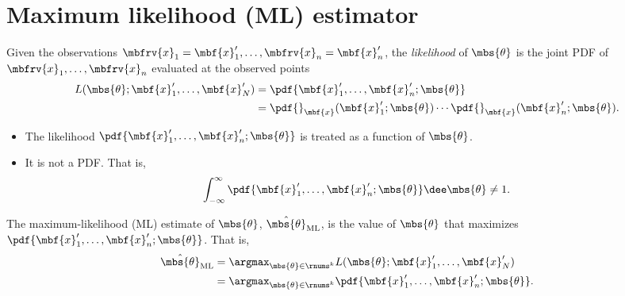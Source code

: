 \section{Maximum likelihood (ML) estimator}
\begin{definitionBox}[Likelihood]
    Given the observations $\mbfrv{x}_{1} = \mbf{x}_{1}', \ldots, \mbfrv{x}_{n}=\mbf{x}_{n}'$, the \emph{likelihood} of $\mbs{\theta}$ is the joint PDF of $\mbfrv{x}_{1},\ldots,\mbfrv{x}_{n}$ evaluated at the observed points
    \begin{align}
        L(\mbs{\theta}; \mbf{x}_{1}', \ldots, \mbf{x}_{N}') &=
        \pdf{\mbf{x}_{1}',\ldots, \mbf{x}_{n}';\mbs{\theta}}\\
         &= \pdf{}_{\mbf{x}}(\mbf{x}_{1}';\mbs{\theta})\cdots\pdf{}_{\mbf{x}}(\mbf{x}_{n}';\mbs{\theta}).
    \end{align}
\end{definitionBox}
\begin{myremark}
    \begin{itemize}
        \item The likelihood $\pdf{\mbf{x}_{1}',\ldots, \mbf{x}_{n}';\mbs{\theta}}$ is treated as a function of $\mbs{\theta}$.
        \item It is not a PDF. That is,
        \begin{align}
            \int_{-\infty}^{\infty}\pdf{\mbf{x}_{1}',\ldots, \mbf{x}_{n}';\mbs{\theta}}\dee\mbs{\theta}\neq 1.
        \end{align}
    \end{itemize}
\end{myremark}

\begin{definitionBox}
    The maximum-likelihood (ML) estimate of $\mbs{\theta}$, $\hat{\mbs{\theta}}_{\mathrm{ML}}$, is the value of $\mbs{\theta}$ that maximizes $\pdf{\mbf{x}_{1}',\ldots, \mbf{x}_{n}';\mbs{\theta}}$. That is,
    \begin{align}
        \hat{\mbs{\theta}}_{\mathrm{ML}} 
        &= \argmax_{\mbs{\theta}\in\rnums^{k}} L(\mbs{\theta}; \mbf{x}_{1}', \ldots, \mbf{x}_{N}')\\
        &= \argmax_{\mbs{\theta}\in\rnums^{k}} \pdf{\mbf{x}_{1}',\ldots, \mbf{x}_{n}';\mbs{\theta}}.
    \end{align}
\end{definitionBox}

